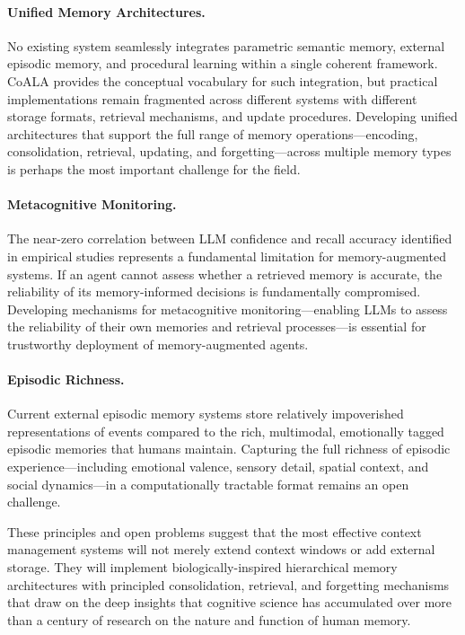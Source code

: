 \paragraph{Unified Memory Architectures.} No existing system seamlessly integrates parametric semantic memory, external episodic memory, and procedural learning within a single coherent framework. CoALA provides the conceptual vocabulary for such integration, but practical implementations remain fragmented across different systems with different storage formats, retrieval mechanisms, and update procedures. Developing unified architectures that support the full range of memory operations---encoding, consolidation, retrieval, updating, and forgetting---across multiple memory types is perhaps the most important challenge for the field.

\paragraph{Metacognitive Monitoring.} The near-zero correlation between LLM confidence and recall accuracy identified in empirical studies represents a fundamental limitation for memory-augmented systems. If an agent cannot assess whether a retrieved memory is accurate, the reliability of its memory-informed decisions is fundamentally compromised. Developing mechanisms for metacognitive monitoring---enabling LLMs to assess the reliability of their own memories and retrieval processes---is essential for trustworthy deployment of memory-augmented agents.

\paragraph{Episodic Richness.} Current external episodic memory systems store relatively impoverished representations of events compared to the rich, multimodal, emotionally tagged episodic memories that humans maintain. Capturing the full richness of episodic experience---including emotional valence, sensory detail, spatial context, and social dynamics---in a computationally tractable format remains an open challenge.

These principles and open problems suggest that the most effective context management systems will not merely extend context windows or add external storage. They will implement biologically-inspired hierarchical memory architectures with principled consolidation, retrieval, and forgetting mechanisms that draw on the deep insights that cognitive science has accumulated over more than a century of research on the nature and function of human memory.
